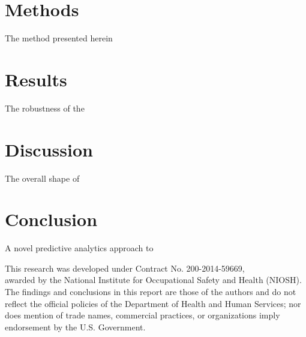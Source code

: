\documentclass[smallcondensed]{svjour3}     %
\begin{document}
\section{Methods}
\label{s:Methods}

The method presented herein


\section{Results}
\label{s:Results}

The robustness of the 

\section{Discussion}
\label{s:Discussion}

The overall shape of 














\section{Conclusion}
\label{s:Conclusion}

A novel predictive analytics approach to 




\begin{acknowledgements}
This research was developed under Contract No. 200-2014-59669,\\
awarded by the National Institute for Occupational Safety and Health (NIOSH). The findings and
conclusions in this report are those of the authors and do not reflect the official
policies of the Department of Health and Human Services; nor does mention of trade names,
commercial practices, or organizations imply endorsement by the U.S. Government.
\end{acknowledgements}

\end{document}
